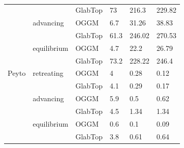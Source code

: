 \documentclass[journal abbreviation, manuscript]{copernicus}
\begin{document}
\begin{table}[]
\begin{tabular}{@{}llllll@{}}
                 &               & GlabTop            & 73               & 216.3                     & 229.82                    \\ \cmidrule(l){2-6} 
                 & advancing     & OGGM               & 6.7              & 31.26                     & 38.83                     \\
                 &               & GlabTop            & 61.3             & 246.02                    & 270.53                    \\ \cmidrule(l){2-6} 
                 & equilibrium   & OGGM               & 4.7              & 22.2                      & 26.79                     \\
                 &               & GlabTop            & 73.2             & 228.22                    & 246.4                     \\ \midrule
Peyto            & retreating    & OGGM               & 4                & 0.28                      & 0.12                      \\
                 &               & GlabTop            & 4.1              & 0.29                      & 0.17                      \\ \cmidrule(l){2-6} 
                 & advancing     & OGGM               & 5.9              & 0.5                       & 0.62                      \\
                 &               & GlabTop            & 4.5              & 1.34                      & 1.34                      \\ \cmidrule(l){2-6} 
                 & equilibrium   & OGGM               & 0.6              & 0.1                       & 0.09                      \\
                 &               & GlabTop            & 3.8              & 0.61                      & 0.64                      \\ \bottomrule
\end{tabular}
\caption{}
\label{tab:sup_fg_statistics}
\end{table}
\end{document}
